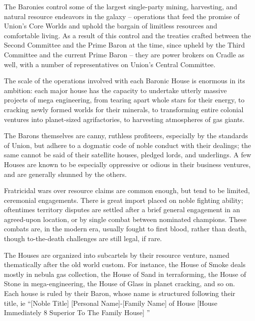 The Baronies control some of the largest single-party mining, harvesting, and natural resource  
endeavors in the galaxy -- operations that feed the promise of Union’s Core Worlds and uphold  
the bargain of limitless resources and comfortable living. As a result of this control and the  
treaties crafted between the Second Committee and the Prime Baron at the time, since upheld  
by the Third Committee and the current Prime Baron -- they are power brokers on Cradle as well,  
with a number of representatives on Union’s Central Committee.  
 

The scale of the operations involved with each Baronic House is enormous in its ambition: each  
major house has the capacity to undertake utterly massive projects of mega engineering, from  
tearing apart whole stars for their energy, to cracking newly formed worlds for their minerals, to  
transforming entire colonial ventures into planet-sized agrifactories, to harvesting atmospheres of  
gas giants. 
 

The Barons themselves are canny, ruthless profiteers, especially by the standards of Union, but  
adhere to a dogmatic code of noble conduct with their dealings; the same cannot be said of their  
satellite houses, pledged lords, and underlings. A few Houses are known to be especially  
oppressive or odious in their business ventures, and are generally shunned by the others. 
 

                                                                                                                 


Fratricidal wars over resource claims are common enough, but tend to be limited, ceremonial  
engagements. There is great import placed on noble fighting ability; oftentimes territory disputes  
are settled after a brief general engagement in an agreed-upon location, or by single combat  
between nominated champions. These combats are, in the modern era, usually fought to first  
blood, rather than death, though to-the-death challenges are still legal, if rare.  
 

The Houses are organized into subcartels by their resource venture, named thematically after the  
old world custom. For instance, the House of Smoke deals mostly in nebula gas collection, the  
House of Sand in terraforming, the House of Stone in mega-engineering, the House of Glass in  
planet cracking, and so on. Each house is ruled by their Baron, whose name is structured  
following their title, ie “[Noble Title] [Personal Name]-[Family Name] of House [House Immediately  
                                      8 
Superior To The Family House] ”
 

